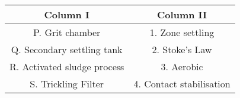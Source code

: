 \begin{tabular}[12pt]{ |c| c|}
    \hline
    \textbf{Column I} & \textbf{Column II}\\ 
    \hline
    P. Grit chamber & 1. Zone settling \\
    \hline 
    Q. Secondary settling tank & 2. Stoke's Law \\
    \hline
    R. Activated sludge process & 3. Aerobic \\
    \hline
    S. Trickling Filter & 4. Contact stabilisation \\
    \hline
    \end{tabular}
